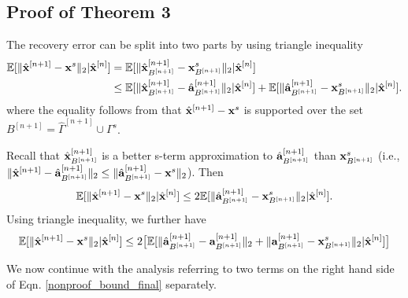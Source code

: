 \documentclass[aoas,preprint]{imsart}
\numberwithin{equation}{section}
\theoremstyle{plain}
\begin{document}
{\subsection{Proof of Theorem 3}
The recovery error can be split into two parts by using triangle inequality
\begin{equation}\label{main_theorem}
\begin{split}
   \mathbb{E}[ \|\hat{{\bf x}}^{[n+1]} - {\bf x}^s \|_2 | \hat{{\bf x}}^{[n]}] &= \mathbb{E}[\|\hat{{\bf x}}_{B^{[n+1]}}^{[n+1]} - {\bf x}_{B^{[n+1]}}^s \|_2| \hat{{\bf x}}^{[n]}] \\
    &\leq \mathbb{E}[\|\hat{{\bf x}}_{B^{[n+1]}}^{[n+1]} - \hat{{\bf a}}_{B^{[n+1]}}^{[n+1]} \|_2| \hat{{\bf x}}^{[n]}] + \mathbb{E}[\|\hat{{\bf a}}_{B^{[n+1]}}^{[n+1]} - {\bf x}_{B^{[n+1]}}^s \|_2| \hat{{\bf x}}^{[n]}].
    \end{split}
\end{equation}
where the equality follows from that $\hat{{\bf x}}^{[n+1]} - {\bf x}^s$ is supported over the set $B^{[n+1]} = \hat{\Gamma}^{[n+1]} \cup \Gamma^s$.

Recall that $\hat{{\bf x}}_{B^{[n+1]}}^{[n+1]}$ is a better s-term approximation to $\hat{{\bf a}}_{B^{[n+1]}}^{[n+1]}$ than ${\bf x}_{B^{[n+1]}}^{s}$ \big(i.e., $\|\hat{{\bf x}}^{[n+1]} - \hat{{\bf a}}_{B^{[n+1]}}^{[n+1]} \|_2\leq \| \hat{{\bf a}}_{B^{[n+1]}}^{[n+1]} - {\bf x}^s \|_2$\big). Then 
\begin{equation}
    \mathbb{E}[\|\hat{{\bf x}}^{[n+1]} - {\bf x}^s \|_2| \hat{{\bf x}}^{[n]}] \leq 2\mathbb{E}[ \|\hat{{\bf a}}_{B^{[n+1]}}^{[n+1]} - {\bf x}_{B^{[n+1]}}^s \|_2 | \hat{{\bf x}}^{[n]}].
\end{equation}
Using triangle inequality, we further have
\begin{equation}\label{nonproof_bound_final}
    \mathbb{E}[\|\hat{{\bf x}}^{[n+1]} - {\bf x}^s \|_2| \hat{{\bf x}}^{[n]}]\leq 2 \big [\mathbb{E}[\|\hat{{\bf a}}_{B^{[n+1]}}^{[n+1]} - {{\bf a}}_{B^{[n+1]}}^{[n+1]} \|_2  + \|{{\bf a}}_{B^{[n+1]}}^{[n+1]} - {{\bf x}}_{B^{[n+1]}}^{s} \|_2 | \hat{{\bf x}}^{[n]}]\big ]
\end{equation}

We now continue with the analysis referring to two terms on the right hand side of Eqn. \ref{nonproof_bound_final} separately.\\

}
\end{document}
